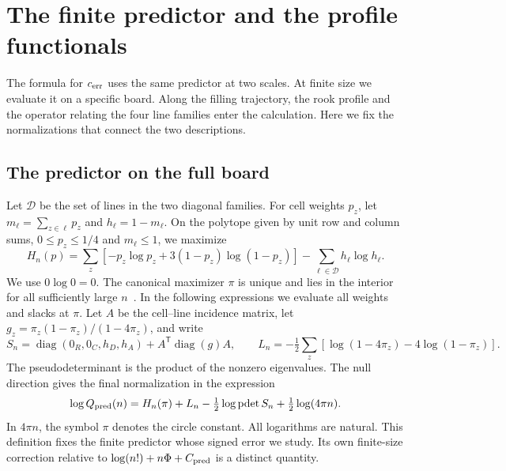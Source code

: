 \section{The finite predictor and the profile functionals}\label{app:predictor}
The formula for \(c_{\mathrm{err}}\) uses the same predictor at two scales. At finite size we evaluate it on
a specific board. Along the filling trajectory, the rook profile and the operator relating the
four line families enter the calculation. Here we fix the normalizations that connect the two
descriptions.

\subsection{The predictor on the full board}
Let $\mathcal D$ be the set of lines in the two diagonal families. For cell weights $p_z$, let
$m_\ell=\sum_{z\in\ell}p_z$ and $h_\ell=1-m_\ell$. On the polytope given by unit row and column
sums, $0\le p_z\le1/4$ and $m_\ell\le1$, we maximize
\[
 H_n(p)=\sum_z[-p_z\log p_z+3(1-p_z)\log(1-p_z)]
            -\sum_{\ell\in\mathcal D} h_\ell\log h_\ell .
\]
We use $0\log0=0$. The canonical maximizer $\pi$ is unique and lies in the interior for all
sufficiently large $n$~\cite[\S3 and (P2.7)]{pc}. In the following expressions we evaluate all
weights and slacks at $\pi$. Let $A$ be the cell--line incidence matrix, let
$g_z=\pi_z(1-\pi_z)/(1-4\pi_z)$, and write
\[
 S_n=\operatorname{diag}(0_R,0_C,h_D,h_A)+A^{\mathsf T}\operatorname{diag}(g)A,\qquad
 L_n=-\tfrac12\sum_z[\log(1-4\pi_z)-4\log(1-\pi_z)].
\]
The pseudodeterminant is the product of the nonzero eigenvalues. The null direction gives the
final normalization in the expression
\[
 \log Q_{\rm pred}(n)=H_n(\pi)+L_n-\tfrac12\log\operatorname{pdet} S_n
                      +\tfrac12\log(4\pi n).
\]
In $4\pi n$, the symbol $\pi$ denotes the circle constant. All logarithms are natural. This
definition fixes the finite predictor whose signed error we study. Its own finite-size correction
relative to $\log(n!)+n\Phi+C_{\rm pred}$ is a distinct quantity.


